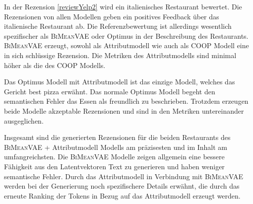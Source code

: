 In der Rezension \ref{reviewYelp2} wird ein italienisches Restaurant bewertet. 
Die Rezensionen von allen Modellen geben ein positives Feedback über das italienische Restaurant ab. 
Die Referenzbewertung ist allerdings wesentlich spezifischer als \textsc{BiMeanVAE} oder Optimus in der Beschreibung des Restaurants.
\textsc{BiMeanVAE} erzeugt, sowohl als Attributmodell wie auch als COOP Modell eine in sich schlüssige Rezension. 
Die Metriken des Attributmodells sind minimal höher als die des COOP Modells.

Das Optimus Modell mit Attributmodell ist das einzige Modell, welches das Gericht \glqq{}best pizza\grqq{} erwähnt. 
Das normale Optimus Modell begeht den semantischen Fehler das Essen als freundlich zu beschrieben. 
Trotzdem erzeugen beide Modelle akzeptable Rezensionen und sind in den Metriken untereinander ausgeglichen.



Insgesamt sind die generierten Rezensionen für die beiden Restaurants des \textsc{BiMeanVAE} + Attributmodell Modells am präzisesten und im Inhalt am umfangreichsten. 
Die \textsc{BiMeanVAE} Modelle zeigen allgemein eine bessere Fähigkeit aus den Latentvektoren Text zu generieren und haben weniger semantische Fehler.
Durch das Attributmodell in Verbindung mit \textsc{BiMeanVAE} werden bei der Generierung noch spezifischere Details erwähnt, die durch das erneute Ranking der Tokens in Bezug auf das Attributmodell erzeugt werden.


\pagebreak
